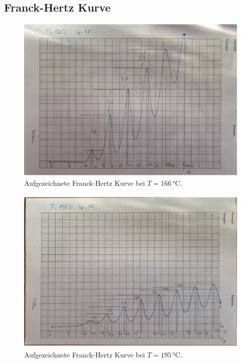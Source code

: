 \subsection{Franck-Hertz Kurve}

\begin{figure}[H]
  \centering
  \includegraphics[height=8cm]{content/data/FH_166.pdf}
  \caption{Aufgezeichnete Franck-Hertz Kurve bei $T=166\,\unit{\celsius}$.}
  \label{fig:FHZ 166Grad}
\end{figure}

\begin{figure}[H]
  \centering
  \includegraphics[height=8cm]{content/data/FH_195.pdf}
  \caption{Aufgezeichnete Franck-Hertz Kurve bei $T=195\,\unit{\celsius}$.}
  \label{fig:FHZ 195Grad}
\end{figure}